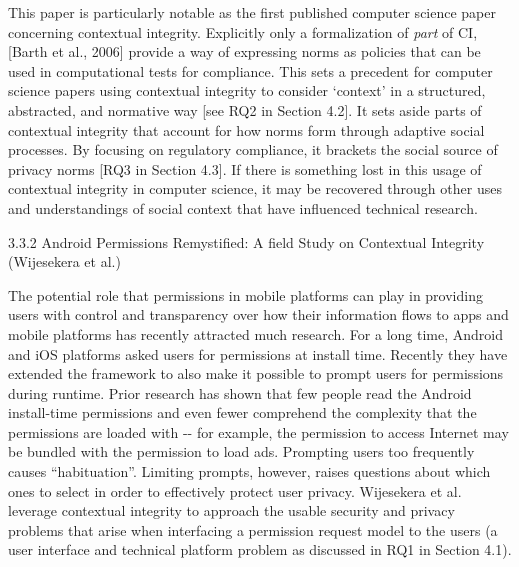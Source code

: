\documentclass[../thesis.tex]{subfiles}
\begin{document}
This paper is particularly notable as the first published computer
science paper concerning contextual integrity. Explicitly only a
formalization of \textit{part} of CI, [Barth et al., 2006] provide a
way of expressing norms as policies that can be used in computational
tests for compliance. This sets a precedent for computer science papers
using contextual integrity to consider
{\textquoteleft}context' in a structured, abstracted,
and normative way [see RQ2 in Section 4.2]. It sets aside parts of
contextual integrity that account for how norms form through adaptive
social processes. By focusing on regulatory compliance, it brackets the
social source of privacy norms [RQ3 in Section 4.3]. If there is
something lost in this usage of contextual integrity in computer
science, it may be recovered through other uses and understandings of
social context that have influenced technical research.


\bigskip

{\color[rgb]{0.2627451,0.2627451,0.2627451}
3.3.2 Android Permissions Remystified: A field Study on Contextual
Integrity (Wijesekera et al.)}

\textcolor[rgb]{0.2,0.2,0.2}{The potential role that permissions in
mobile platforms can play in providing users with control and
transparency over how their information flows to apps and mobile
platforms has recently attracted much research. For a long time,
Android and iOS platforms asked users for permissions at install time.
Recently they have extended the framework to also make it possible to
prompt users for permissions during runtime. Prior research has shown
that few people read the Android install-time permissions and even
fewer comprehend the complexity that the permissions are loaded with
-{}- for example, the permission to access Internet may be bundled with
the permission to load ads. Prompting users too frequently causes
``habituation''. Limiting prompts,
however, raises questions about which ones to select in order to
effectively protect user privacy. Wijesekera et al. leverage contextual
integrity to approach the usable security and privacy problems that
arise when interfacing a permission request model to the users (a user
interface and technical platform problem as discussed in RQ1 in Section
4.1).}
\end{document}
